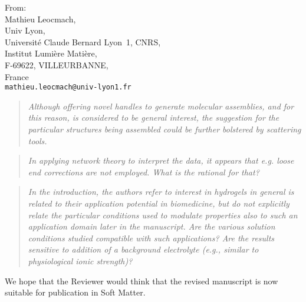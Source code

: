 \documentclass[a4paper, parskip=true, firsthead=false, fromemail=true, foldmarks=false]{scrlttr2}
\newenvironment{quotationi}
{\begin{quotation}\itshape}
{\end{quotation}}
\newcommand{\journal}{Soft Matter}
\begin{document}
\begin{letter}{From:\\
Mathieu Leocmach,\\
Univ Lyon,\\ 
Universit\'e Claude Bernard Lyon~1, CNRS,\\
Institut Lumi\`ere Mati\`ere,\\
F-69622, VILLEURBANNE,\\
France\\
\texttt{mathieu.leocmach@univ-lyon1.fr}
}
\begin{quotationi}
Although offering novel handles to generate molecular assemblies, and for this reason, is considered to be general interest, the suggestion for the particular structures being assembled could be further bolstered by scattering tools.
\end{quotationi}

\begin{quotationi}
In applying network theory to interpret the data, it appears that e.g. loose end corrections are not employed. What is the rational for that?
\end{quotationi}

\begin{quotationi}
In the introduction, the authors refer to interest in hydrogels in general is related to their application potential in biomedicine, but do not explicitly relate the particular conditions used to modulate properties also to such an application domain later in the manuscript. Are the various solution conditions studied compatible with such applications? Are the results sensitive to addition of a background electrolyte (e.g., similar to physiological ionic strength)?

\end{quotationi}



We hope that the Reviewer would think that the revised manuscript is now suitable for publication in \journal. 


\end{letter} 
\end{document}
